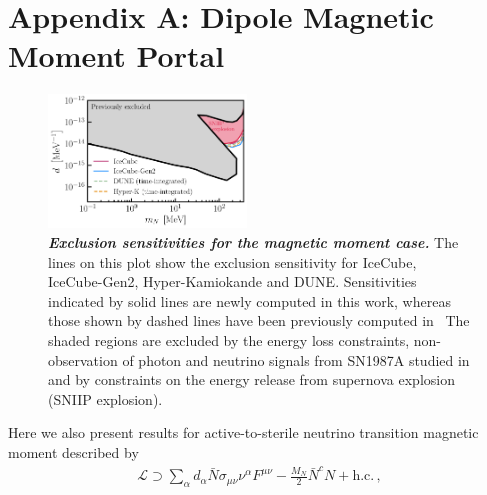 \documentclass[aps,twocolumn,prl,showpacs,showkeys,preprintnumbers,superscriptaddress,nobibnotes,floatfix,longbibliography,notitlepage,nofootinbib]{revtex4-2}
\begin{document}
\section{Appendix A: Dipole Magnetic Moment Portal}
\begin{figure}[hb!]
    \centering
    \includegraphics[width=0.47\textwidth]{figures/magnetic_moment_sensitivity}
    \caption{\textbf{\textit{Exclusion sensitivities for the magnetic moment case.}}
    The lines on this plot show the exclusion sensitivity for IceCube, IceCube-Gen2, Hyper-Kamiokande and DUNE. 
    Sensitivities indicated by solid lines are newly computed in this work, whereas those shown by dashed lines have been previously computed in~\cite{Brdar:2023tmi}
    The shaded regions are excluded by the energy loss constraints, non-observation of photon and neutrino signals from SN1987A studied in \cite{Brdar:2023tmi} and by constraints on the energy release from supernova explosion (SNIIP explosion)\cite{PhysRevLett.128.221103, chauhan2024probing}.
    }
    \label{fig:magnetic_moment_sensitivity}
\end{figure}
Here we also present results for active-to-sterile neutrino transition magnetic moment described by \cite{Magill:2018jla,Brdar:2020quo,Brdar:2023tmi}
\begin{align}
    \mathcal{L} \supset \sum_\alpha d_\alpha \bar{N}\sigma_{\mu\nu} \nu^{\alpha} F^{\mu\nu}-\frac{M_N}{2} \bar{N}^c N + \text{h.c.}\,,
    \label{eq:Lag}
\end{align}
\end{document}
